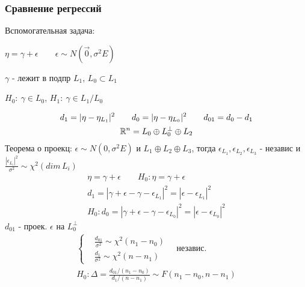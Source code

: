 \documentclass{article}
\begin{document}
\subsubsection{Сравнение регрессий}
Вспомогательная задача: 

$\eta = \gamma + \epsilon \qquad \epsilon \sim N(\vec{0}, \sigma^{2}E)$

$\gamma$ - лежит в подпр $L_1$, $L_0 \subset L_1$

$H_0: \: \gamma \in L_0$, $H_1: \: \gamma \in L_1/L_0$

\begin{gather*}
  d_1=|\eta-\eta_{L_1}|^{2} \qquad d_0=|\eta-\eta_{L_0}|^{2} \qquad d_{01}=d_0 -d_1 \\ 
  \mathbb{R}^{n}=L_0 \oplus L_0^{\perp} \oplus L_2
\end{gather*}
Теорема о проекц: $\epsilon \sim N(0, \sigma^{2} E)$ и $L_1 \oplus L_2 \oplus L_3$,
тогда $\epsilon_{L_1},\epsilon_{L_2},\epsilon_{L_3}$ - независ и $\frac{|\epsilon_{L_i}|^{2}}{\sigma^{2}} \sim \chi^{2}(dim \, L_i)$
\begin{gather*}
  \eta = \gamma + \epsilon \qquad H_0: \eta=\gamma+\epsilon \\ 
  d_1 = |\gamma+\epsilon - \gamma - \epsilon_{L_1}|^{2}=|\epsilon-\epsilon_{L_1}|^{2} \\ 
  H_0: d_0=|\gamma+\epsilon-\gamma-\epsilon_{L_0}|^{2}=|\epsilon-\epsilon_{L_0}|^{2}
\end{gather*}
$d_{01}$ - проек. $\epsilon$ на $L_0^{\perp}$
\begin{gather*}
  \left\{\begin{aligned}
    &\frac{d_{01}}{\sigma^{2}}\sim \chi^{2}(n_1-n_0) \\ 
    & \frac{d_1}{\sigma^{2}}\sim \chi^{2}(n-n_1)
  \end{aligned}\right. \quad \text{независ.} \\ 
  H_0: \Delta=\frac{d_{01}/(n_1-n_0)}{d_1/(n-n_1)}\sim F(n_1-n_0, n-n_1)
\end{gather*}
\end{document}
